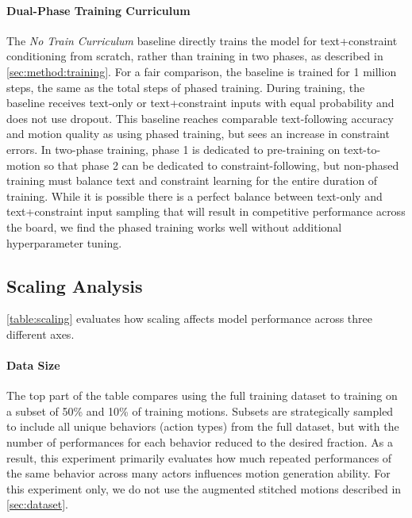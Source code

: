 \paragraph{Dual-Phase Training Curriculum}
The \textit{No Train Curriculum} baseline directly trains the model for text+constraint conditioning from scratch, rather than training in two phases, as described in \cref{sec:method:training}. For a fair comparison, the baseline is trained for 1 million steps, the same as the total steps of phased training. During training, the baseline receives text-only or text+constraint inputs with equal probability and does not use dropout. 
This baseline reaches comparable text-following accuracy and motion quality as using phased training, but sees an increase in constraint errors. 
In two-phase training, phase 1 is dedicated to pre-training on text-to-motion so that phase 2 can be dedicated to constraint-following, but non-phased training must balance text and constraint learning for the entire duration of training. While it is possible there is a perfect balance between text-only and text+constraint input sampling that will result in competitive performance across the board, we find the phased training works well without additional hyperparameter tuning.



\subsection{Scaling Analysis}
\label{sec:experiments:scaling}

\cref{table:scaling} evaluates how scaling affects model performance across three different axes.

\paragraph{Data Size} 
The top part of the table compares using the full training dataset to training on a subset of 50\% and 10\% of training motions. 
Subsets are strategically sampled to include all unique behaviors (action types) from the full dataset, but with the number of performances for each behavior reduced to the desired fraction. As a result, this experiment primarily evaluates how much repeated performances of the same behavior across many actors influences motion generation ability. 
For this experiment only, we do not use the augmented stitched motions described in \cref{sec:dataset}.

